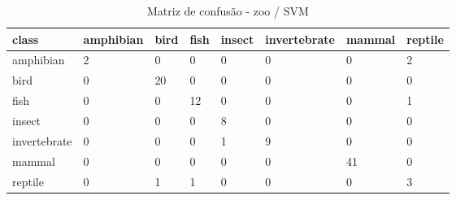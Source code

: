 \begin{table}[htbp]
\centering
\begin{tabular}{llllllll}
\hline
class & amphibian & bird & fish & insect & invertebrate & mammal & reptile \\
\hline
amphibian & 2 & 0 & 0 & 0 & 0 & 0 & 2 \\
bird & 0 & 20 & 0 & 0 & 0 & 0 & 0 \\
fish & 0 & 0 & 12 & 0 & 0 & 0 & 1 \\
insect & 0 & 0 & 0 & 8 & 0 & 0 & 0 \\
invertebrate & 0 & 0 & 0 & 1 & 9 & 0 & 0 \\
mammal & 0 & 0 & 0 & 0 & 0 & 41 & 0 \\
reptile & 0 & 1 & 1 & 0 & 0 & 0 & 3 \\
\hline
\end{tabular}
\caption{Matriz de confusão - zoo / SVM}
\label{tab:ex3-zoo-svm-cm}
\end{table}